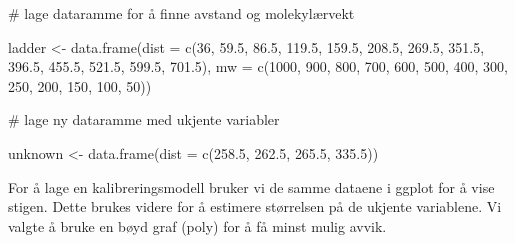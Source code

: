 \documentclass[
  letterpaper,
  DIV=11,
  numbers=noendperiod]{scrartcl}
\newenvironment{Shaded}{\begin{snugshade}}{\end{snugshade}}
\newcommand{\AttributeTok}[1]{\textcolor[rgb]{0.40,0.45,0.13}{#1}}
\newcommand{\CommentTok}[1]{\textcolor[rgb]{0.37,0.37,0.37}{#1}}
\newcommand{\DecValTok}[1]{\textcolor[rgb]{0.68,0.00,0.00}{#1}}
\newcommand{\FloatTok}[1]{\textcolor[rgb]{0.68,0.00,0.00}{#1}}
\newcommand{\FunctionTok}[1]{\textcolor[rgb]{0.28,0.35,0.67}{#1}}
\newcommand{\NormalTok}[1]{\textcolor[rgb]{0.00,0.23,0.31}{#1}}
\newcommand{\OtherTok}[1]{\textcolor[rgb]{0.00,0.23,0.31}{#1}}
\begin{document}
\begin{Shaded}
\begin{Highlighting}[]
\CommentTok{\# lage dataramme for å finne avstand og molekylærvekt}

\NormalTok{ladder }\OtherTok{\textless{}{-}} \FunctionTok{data.frame}\NormalTok{(}\AttributeTok{dist =} \FunctionTok{c}\NormalTok{(}\DecValTok{36}\NormalTok{, }\FloatTok{59.5}\NormalTok{, }\FloatTok{86.5}\NormalTok{,}
                              \FloatTok{119.5}\NormalTok{, }\FloatTok{159.5}\NormalTok{, }\FloatTok{208.5}\NormalTok{,}
                              \FloatTok{269.5}\NormalTok{, }\FloatTok{351.5}\NormalTok{, }\FloatTok{396.5}\NormalTok{,}
                              \FloatTok{455.5}\NormalTok{, }\FloatTok{521.5}\NormalTok{, }\FloatTok{599.5}\NormalTok{, }\FloatTok{701.5}\NormalTok{),}
                     \AttributeTok{mw =} \FunctionTok{c}\NormalTok{(}\DecValTok{1000}\NormalTok{, }\DecValTok{900}\NormalTok{, }\DecValTok{800}\NormalTok{, }
                            \DecValTok{700}\NormalTok{, }\DecValTok{600}\NormalTok{, }\DecValTok{500}\NormalTok{, }
                            \DecValTok{400}\NormalTok{, }\DecValTok{300}\NormalTok{, }\DecValTok{250}\NormalTok{, }
                            \DecValTok{200}\NormalTok{, }\DecValTok{150}\NormalTok{, }\DecValTok{100}\NormalTok{, }\DecValTok{50}\NormalTok{))}

\CommentTok{\# lage ny dataramme med ukjente variabler}

\NormalTok{unknown }\OtherTok{\textless{}{-}} \FunctionTok{data.frame}\NormalTok{(}\AttributeTok{dist =} \FunctionTok{c}\NormalTok{(}\FloatTok{258.5}\NormalTok{, }\FloatTok{262.5}\NormalTok{, }\FloatTok{265.5}\NormalTok{, }\FloatTok{335.5}\NormalTok{))}
\end{Highlighting}
\end{Shaded}

For å lage en kalibreringsmodell bruker vi de samme dataene i ggplot for
å vise stigen. Dette brukes videre for å estimere størrelsen på de
ukjente variablene. Vi valgte å bruke en bøyd graf (poly) for å få minst
mulig avvik.
\end{document}
